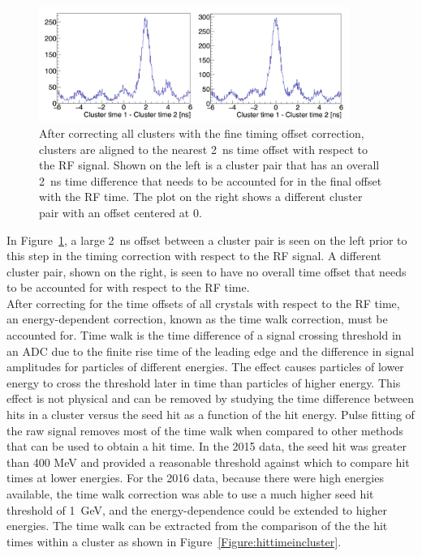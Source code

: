 \begin{figure}[H]
  \centering
      \includegraphics[width=0.9\textwidth]{pics/performance/2clusteroffset.png}
  \caption[Time difference between two clusters after fine offset time correction]{After correcting all clusters with the fine timing offset correction, clusters are aligned to the nearest 2~ns time offset with respect to the RF signal. Shown on the left is a cluster pair that has an overall 2~ns time difference that needs to be accounted for in the final offset with the RF time. The plot on the right shows a different cluster pair with an offset centered at 0.}
  \label{Figure:2clusoffset}
\end{figure}

In Figure~\ref{Figure:2clusoffset}, a large 2~ns offset between a cluster pair is seen on the left prior to this step in the timing correction with respect to the RF signal. A different cluster pair, shown on the right, is seen to have no overall time offset that needs to be accounted for with respect to the RF time. \\
\indent After correcting for the time offsets of all crystals with respect to the RF time, an energy-dependent correction, known as the time walk correction, must be accounted for. Time walk is the time difference of a signal crossing threshold in an ADC due to the finite rise time of the leading edge and the difference in signal amplitudes for particles of different energies. The effect causes particles of lower energy to cross the threshold later in time than particles of higher energy. This effect is not physical and can be removed by studying the time difference between hits in a cluster versus the seed hit as a function of the hit energy. Pulse fitting of the raw signal removes most of the time walk when compared to other methods that can be used to obtain a hit time. In the 2015 data, the seed hit was greater than 400 MeV and provided a reasonable threshold against which to compare hit times at lower energies. For the 2016 data, because there were high energies available, the time walk correction was able to use a much higher seed hit threshold of 1~GeV, and the energy-dependence could be extended to higher energies. The time walk can be extracted from the comparison of the the hit times within a cluster as shown in Figure~\ref{Figure:hittimeincluster}.

